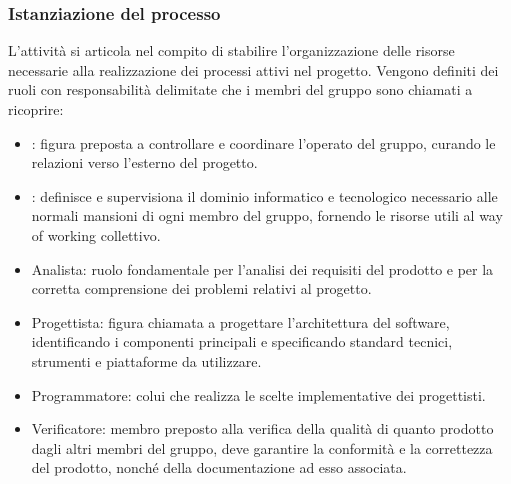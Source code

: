 \subsubsection{Istanziazione del processo}
L'attività si articola nel compito di stabilire l'organizzazione delle risorse necessarie alla realizzazione dei processi attivi nel progetto. Vengono definiti dei ruoli con responsabilità delimitate che i membri del gruppo sono chiamati a ricoprire:
\begin{itemize}
    \item {}: figura preposta a controllare e coordinare l'operato del gruppo, curando le relazioni verso l'esterno del progetto.
    \item {}: definisce e supervisiona il dominio informatico e tecnologico necessario alle normali mansioni di ogni membro del gruppo, fornendo le risorse utili al way of working collettivo.
    \item Analista: ruolo fondamentale per l'analisi dei requisiti del prodotto e per la corretta comprensione dei problemi relativi al progetto.
    \item Progettista: figura chiamata a progettare l'architettura del software, identificando i componenti principali e specificando standard tecnici, strumenti e piattaforme da utilizzare.
    \item Programmatore: colui che realizza le scelte implementative dei progettisti.
    \item Verificatore: membro preposto alla verifica della qualità di quanto prodotto dagli altri membri del gruppo, deve garantire la conformità e la correttezza del prodotto, nonché della documentazione ad esso associata.
\end{itemize}

